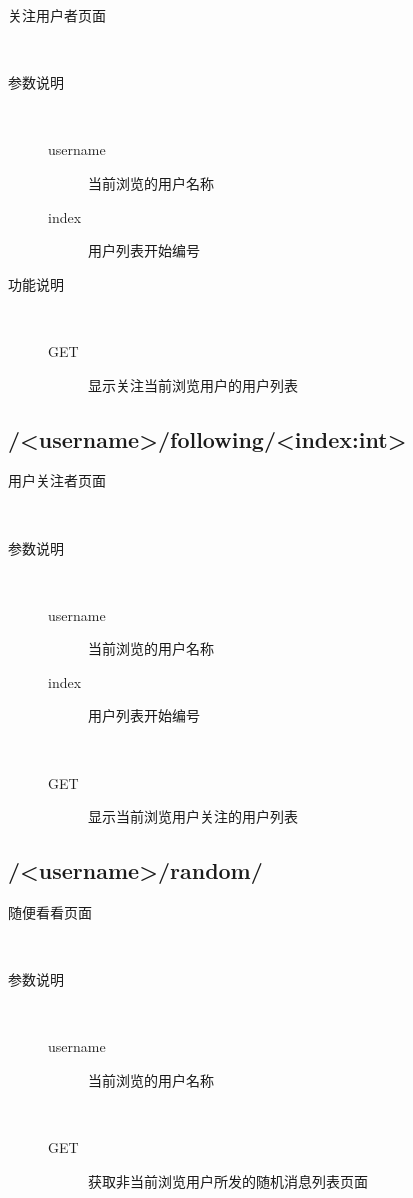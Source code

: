 \documentclass{yaldc}
\begin{document}
\begin{description}
    \item[关注用户者页面] ~
    \item[参数说明] ~
        \begin{description}
            \item[username] 当前浏览的用户名称
            \item[index] 用户列表开始编号
        \end{description}
    \item[功能说明] ~
        \begin{description}
            \item[GET] 显示关注当前浏览用户的用户列表
        \end{description}
\end{description}

\subsection{/<username>/following/<index:int>}

\begin{description}
    \item[用户关注者页面] ~
    \item[参数说明] ~
        \begin{description}
            \item[username] 当前浏览的用户名称
            \item[index] 用户列表开始编号
        \end{description}
    \item[] ~
        \begin{description}
            \item[GET] 显示当前浏览用户关注的用户列表
        \end{description}
\end{description}

\subsection{/<username>/random/}

\begin{description}
    \item[随便看看页面] ~
    \item[参数说明] ~
        \begin{description}
            \item[username] 当前浏览的用户名称
        \end{description}
    \item[] ~
        \begin{description}
            \item[GET] 获取非当前浏览用户所发的随机消息列表页面
        \end{description}
\end{description}
\end{document}
